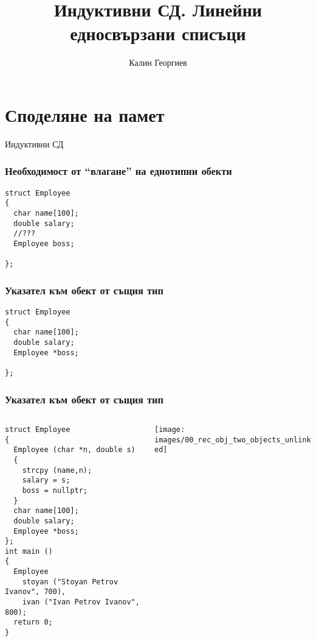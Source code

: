 \documentclass{beamer}
\begin{document}
\title[Обектно ориентирано програмиране]{Индуктивни СД. Линейни едносвързани списъци} 
\author{Калин Георгиев} 
\frame{\titlepage} 

\section{Споделяне на памет} 


\begin{frame}
\centerline{Индуктивни СД}
\end{frame}


\begin{frame}[fragile]
\frametitle{Необходимост от ``влагане'' на еднотипни обекти}
\begin{flushleft}
\begin{lstlisting}
struct Employee
{
  char name[100];
  double salary;
  //???
  Employee boss;

};
\end{lstlisting}  
\end{flushleft}
\end{frame}


\begin{frame}[fragile]
\frametitle{Указател към обект от същия тип}
\begin{flushleft}
\begin{lstlisting}
struct Employee
{
  char name[100];
  double salary;
  Employee *boss;

};
\end{lstlisting}  
\end{flushleft}
\end{frame}


\begin{frame}[fragile]
\frametitle{Указател към обект от същия тип}

\begin{columns}[c]
  \begin{column}{0.55\textwidth}
\begin{flushleft}
\begin{lstlisting}
struct Employee
{
  Employee (char *n, double s)
  {
    strcpy (name,n);
    salary = s;
    boss = nullptr;
  }
  char name[100];
  double salary;
  Employee *boss;
};
int main ()
{
  Employee 
    stoyan ("Stoyan Petrov Ivanov", 700),
    ivan ("Ivan Petrov Ivanov", 800);
  return 0;
}

\end{lstlisting}  
\end{flushleft}

  \end{column}
  \begin{column}{0.45\textwidth}
\hspace{-100px}
\texttt{[image: images/00\_rec\_obj\_two\_objects\_unlinked]}

  \end{column}
\end{columns}
\end{frame}
\end{document}
